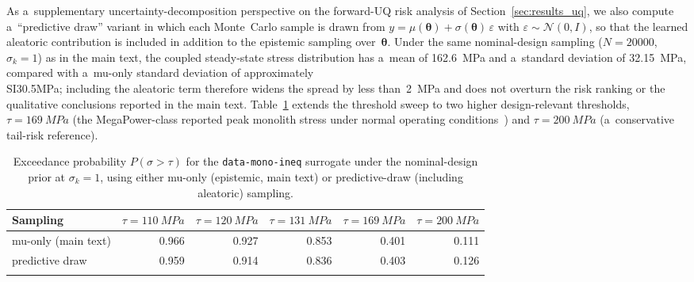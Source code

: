 \documentclass[pdflatex,sn-mathphys-num]{sn-jnl}
\theoremstyle{thmstyleone}
\theoremstyle{thmstyletwo}
\theoremstyle{thmstylethree}
\begin{document}
\begin{appendices}
As a~supplementary uncertainty-decomposition perspective on the forward-UQ
risk analysis of Section~\ref{sec:results_uq}, we also compute a~``predictive
draw'' variant in which each Monte~Carlo sample is drawn from
$y = \mu(\bm{\theta}) + \sigma(\bm{\theta})\,\varepsilon$ with
$\varepsilon\sim\mathcal{N}(0,I)$, so that the learned aleatoric contribution
is included in addition to the epistemic sampling over~$\bm{\theta}$.
Under the same nominal-design sampling
($N=\num{20000}$, $\sigma_k=1$) as in the main text, the coupled steady-state
stress distribution has a~mean of \SI{162.6}{MPa} and a~standard deviation of
\SI{32.15}{MPa}, compared with a~mu-only standard deviation of approximately
\\SI{30.5}{MPa}; including the aleatoric term therefore widens the spread by
less than~\SI{2}{MPa} and does not overturn the risk ranking or the
qualitative conclusions reported in the main text.
Table~\ref{tab:forward_uq_appendix} extends the threshold sweep to two
higher design-relevant thresholds, $\tau=\SI{169}{MPa}$
(the MegaPower-class reported peak monolith stress under normal operating
conditions~\cite{ref:zhang2025energy}) and $\tau=\SI{200}{MPa}$
(a~conservative tail-risk reference).

\begin{table}[ht]
\caption{%
  Exceedance probability $P(\sigma > \tau)$ for the \texttt{data-mono-ineq}
  surrogate under the nominal-design prior at $\sigma_k=1$,
  using either mu-only (epistemic, main text) or predictive-draw (including
  aleatoric) sampling.
}\label{tab:forward_uq_appendix}
\begin{tabular}{@{}lrrrrr@{}}
\toprule
Sampling & $\tau=\SI{110}{MPa}$ & $\tau=\SI{120}{MPa}$ & $\tau=\SI{131}{MPa}$
         & $\tau=\SI{169}{MPa}$ & $\tau=\SI{200}{MPa}$ \\
\midrule
mu-only (main text)        & 0.966 & 0.927 & 0.853 & 0.401 & 0.111 \\
predictive draw            & 0.959 & 0.914 & 0.836 & 0.403 & 0.126 \\
\botrule
\end{tabular}
\end{table}


\end{appendices}
\end{document}
